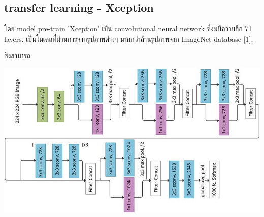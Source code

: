   \subsection{transfer learning - Xception}
  โดย model pre-train 'Xception' เป็น convolutional neural network ซึ่งมมีความลึก 71 layers.
เป็นโมเดลที่ผ่านการจากรูปภาพต่างๆ มากกว่าล้านรูปภาพจาก ImageNet database [1].


  ซึ่งสามารถ
\begin{center}
  \includegraphics[scale=0.35]{pic/x.png}
\end{center}




